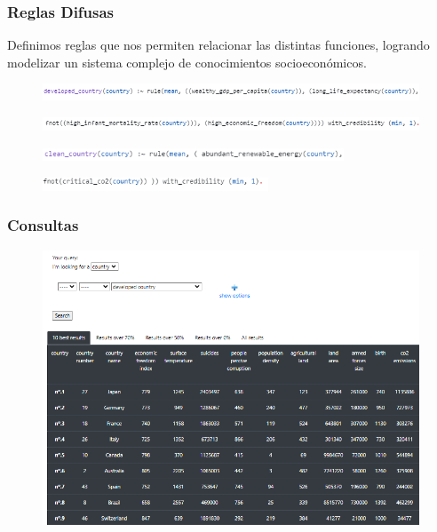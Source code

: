 \documentclass{beamer}
\newcommand{\slideauthor}[1]{\gdef\insertslideauthor{#1}}
\begin{document}
\begin{frame}
\frametitle{Reglas Difusas}
\slideauthor{Javier Comyn}
Definimos reglas que nos permiten relacionar las distintas funciones, logrando modelizar un sistema complejo de conocimientos socioeconómicos.
\vspace*{+5mm}
\begin{figure}
\includegraphics[width=\textwidth]{Images/developed_1.png} 
\end{figure}
\vspace*{-5mm} %
\begin{figure}
\includegraphics[width=\textwidth]{Images/developed_2.png} 
\end{figure}
\begin{figure}
\includegraphics[width=0.80\textwidth]{Images/clean_1.png} 
\end{figure}
\vspace*{-5mm} %
\begin{figure}
\includegraphics[width=0.60\textwidth]{Images/clean_2.png} 
\end{figure}
\end{frame}

\begin{frame}
\frametitle{Consultas}
\slideauthor{Javier Comyn}
\begin{figure}
\includegraphics[width=\textwidth]{Images/developed_country (1).png} 
\end{figure}
\end{frame}
\end{document}
